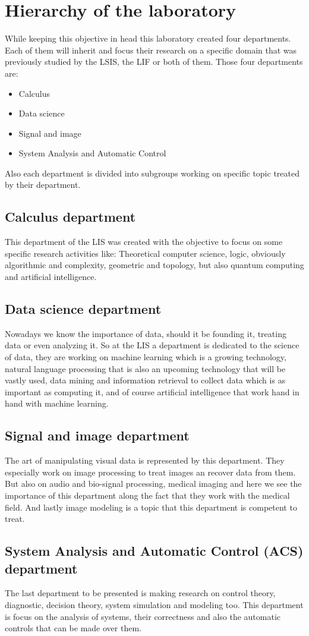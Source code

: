 \section{Hierarchy of the laboratory}
While keeping this objective in head this laboratory created four departments. Each of them will inherit and focus their research on a specific domain that was previously studied by the LSIS, the LIF or both of them.
Those four departments are:
\begin{itemize}[noitemsep, nolistsep]
	\item{Calculus}
	\item{Data science}
	\item{Signal and image}
	\item{System Analysis and Automatic Control}
\end{itemize}
Also each department is divided into subgroups working on specific topic treated by their department.

\subsection{Calculus department}
This department of the LIS was created with the objective to focus on some specific research activities like: Theoretical computer science, logic, obviously algorithmic and complexity, geometric and topology, but also quantum computing and artificial intelligence.
\subsection{Data science department}
Nowadays we know the importance of data, should it be founding it, treating data or even analyzing it. So at the LIS a department is dedicated to the science of data, they are working on  machine learning which is a growing technology, natural language processing that is also an upcoming technology that will be vastly used, data mining and information retrieval to collect data which is as important as computing it, and of course artificial intelligence that work hand in hand with machine learning.
\subsection{Signal and image department}
The art of manipulating visual data is represented by this department. They especially work on  image processing to treat images an recover data from them. But also on audio and bio-signal processing, medical imaging and here we see the importance of this department along the fact that they work with the medical field. And lastly image modeling is a topic that this department is competent to treat.
\subsection{System Analysis and Automatic Control (ACS) department}
The last department to be presented is making research on control theory, diagnostic, decision theory, system simulation and modeling too. This department is focus on the analysis of systems, their correctness and also the automatic controls that can be made over them.